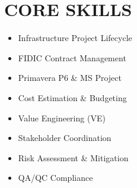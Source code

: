 \documentclass[10pt,a4paper]{article}
\begin{document}
\begin{minipage}[t]{0.32\textwidth}
    \vspace{0.3cm}
    
    \section*{CORE SKILLS}
    \begin{itemize}[leftmargin=10pt, label={\color{accent}\scriptsize$\bullet$}]
        \item Infrastructure Project Lifecycle
        \item FIDIC Contract Management
        \item Primavera P6 \& MS Project
        \item Cost Estimation \& Budgeting
        \item Value Engineering (VE)
        \item Stakeholder Coordination
        \item Risk Assessment \& Mitigation
        \item QA/QC Compliance
    \end{itemize}
\end{minipage}%
\hfill
\end{document}
